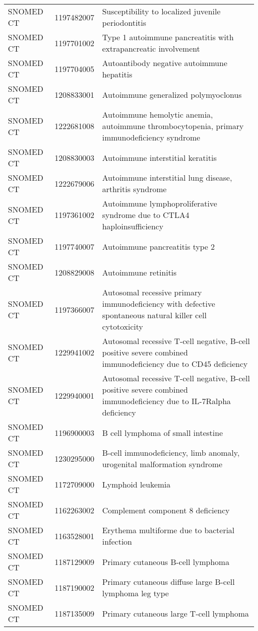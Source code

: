 \begin{longtable}{p{}p{}p{}}
  SNOMED CT & 1197482007 & Susceptibility to localized juvenile periodontitis \\ 
  SNOMED CT & 1197701002 & Type 1 autoimmune pancreatitis with extrapancreatic involvement \\ 
  SNOMED CT & 1197704005 & Autoantibody negative autoimmune hepatitis \\ 
  SNOMED CT & 1208833001 & Autoimmune generalized polymyoclonus \\ 
  SNOMED CT & 1222681008 & Autoimmune hemolytic anemia, autoimmune thrombocytopenia, primary immunodeficiency syndrome \\ 
  SNOMED CT & 1208830003 & Autoimmune interstitial keratitis \\ 
  SNOMED CT & 1222679006 & Autoimmune interstitial lung disease, arthritis syndrome \\ 
  SNOMED CT & 1197361002 & Autoimmune lymphoproliferative syndrome due to CTLA4 haploinsufficiency \\ 
  SNOMED CT & 1197740007 & Autoimmune pancreatitis type 2 \\ 
  SNOMED CT & 1208829008 & Autoimmune retinitis \\ 
  SNOMED CT & 1197366007 & Autosomal recessive primary immunodeficiency with defective spontaneous natural killer cell cytotoxicity \\ 
  SNOMED CT & 1229941002 & Autosomal recessive T-cell negative, B-cell positive severe combined immunodeficiency due to CD45 deficiency \\ 
  SNOMED CT & 1229940001 & Autosomal recessive T-cell negative, B-cell positive severe combined immunodeficiency due to IL-7Ralpha deficiency \\ 
  SNOMED CT & 1196900003 & B cell lymphoma of small intestine \\ 
  SNOMED CT & 1230295000 & B-cell immunodeficiency, limb anomaly, urogenital malformation syndrome \\ 
  SNOMED CT & 1172709000 & Lymphoid leukemia \\ 
  SNOMED CT & 1162263002 & Complement component 8 deficiency \\ 
  SNOMED CT & 1163528001 & Erythema multiforme due to bacterial infection \\ 
  SNOMED CT & 1187129009 & Primary cutaneous B-cell lymphoma \\ 
  SNOMED CT & 1187190002 & Primary cutaneous diffuse large B-cell lymphoma leg type \\ 
  SNOMED CT & 1187135009 & Primary cutaneous large T-cell lymphoma \\ 

\end{longtable}
